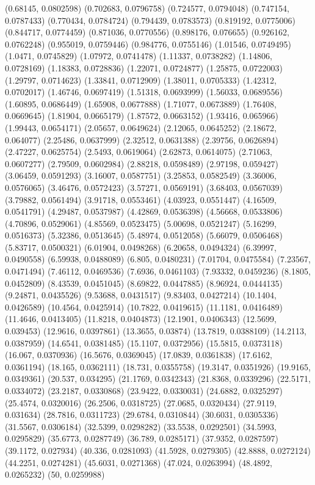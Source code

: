 {(0.68145, 0.0802598)
(0.702683, 0.0796758)
(0.724577, 0.0794048)
(0.747154, 0.0787433)
(0.770434, 0.0784724)
(0.794439, 0.0783573)
(0.819192, 0.0775006)
(0.844717, 0.0774459)
(0.871036, 0.0770556)
(0.898176, 0.076655)
(0.926162, 0.0762248)
(0.955019, 0.0759446)
(0.984776, 0.0755146)
(1.01546, 0.0749495)
(1.0471, 0.0745829)
(1.07972, 0.0741478)
(1.11337, 0.0738282)
(1.14806, 0.0728169)
(1.18383, 0.0728836)
(1.22071, 0.0724877)
(1.25875, 0.0722003)
(1.29797, 0.0714623)
(1.33841, 0.0712909)
(1.38011, 0.0705333)
(1.42312, 0.0702017)
(1.46746, 0.0697419)
(1.51318, 0.0693999)
(1.56033, 0.0689556)
(1.60895, 0.0686449)
(1.65908, 0.0677888)
(1.71077, 0.0673889)
(1.76408, 0.0669645)
(1.81904, 0.0665179)
(1.87572, 0.0663152)
(1.93416, 0.065966)
(1.99443, 0.0654171)
(2.05657, 0.0649624)
(2.12065, 0.0645252)
(2.18672, 0.064077)
(2.25486, 0.0637999)
(2.32512, 0.0631388)
(2.39756, 0.0626894)
(2.47227, 0.0625754)
(2.5493, 0.0619064)
(2.62873, 0.0614075)
(2.71063, 0.0607277)
(2.79509, 0.0602984)
(2.88218, 0.0598489)
(2.97198, 0.059427)
(3.06459, 0.0591293)
(3.16007, 0.0587751)
(3.25853, 0.0582549)
(3.36006, 0.0576065)
(3.46476, 0.0572423)
(3.57271, 0.0569191)
(3.68403, 0.0567039)
(3.79882, 0.0561494)
(3.91718, 0.0553461)
(4.03923, 0.0551447)
(4.16509, 0.0541791)
(4.29487, 0.0537987)
(4.42869, 0.0536398)
(4.56668, 0.0533806)
(4.70896, 0.0529061)
(4.85569, 0.0523475)
(5.00698, 0.0521247)
(5.16299, 0.0516373)
(5.32386, 0.0513645)
(5.48974, 0.0512058)
(5.66079, 0.0506468)
(5.83717, 0.0500321)
(6.01904, 0.0498268)
(6.20658, 0.0494324)
(6.39997, 0.0490558)
(6.59938, 0.0488089)
(6.805, 0.0480231)
(7.01704, 0.0475584)
(7.23567, 0.0471494)
(7.46112, 0.0469536)
(7.6936, 0.0461103)
(7.93332, 0.0459236)
(8.1805, 0.0452809)
(8.43539, 0.0451045)
(8.69822, 0.0447885)
(8.96924, 0.0444135)
(9.24871, 0.0435526)
(9.53688, 0.0431517)
(9.83403, 0.0427214)
(10.1404, 0.0426589)
(10.4564, 0.0425914)
(10.7822, 0.0419615)
(11.1181, 0.0416489)
(11.4646, 0.0413405)
(11.8218, 0.0404873)
(12.1901, 0.0406343)
(12.5699, 0.039453)
(12.9616, 0.0397861)
(13.3655, 0.03874)
(13.7819, 0.0388109)
(14.2113, 0.0387959)
(14.6541, 0.0381485)
(15.1107, 0.0372956)
(15.5815, 0.0373118)
(16.067, 0.0370936)
(16.5676, 0.0369045)
(17.0839, 0.0361838)
(17.6162, 0.0361194)
(18.165, 0.0362111)
(18.731, 0.0355758)
(19.3147, 0.0351926)
(19.9165, 0.0349361)
(20.537, 0.034295)
(21.1769, 0.0342343)
(21.8368, 0.0339296)
(22.5171, 0.0334072)
(23.2187, 0.0330868)
(23.9422, 0.0330031)
(24.6882, 0.0325297)
(25.4574, 0.0320016)
(26.2506, 0.0318725)
(27.0685, 0.0320434)
(27.9119, 0.031634)
(28.7816, 0.0311723)
(29.6784, 0.0310844)
(30.6031, 0.0305336)
(31.5567, 0.0306184)
(32.5399, 0.0298282)
(33.5538, 0.0292501)
(34.5993, 0.0295829)
(35.6773, 0.0287749)
(36.789, 0.0285171)
(37.9352, 0.0287597)
(39.1172, 0.027934)
(40.336, 0.0281093)
(41.5928, 0.0279305)
(42.8888, 0.0272124)
(44.2251, 0.0274281)
(45.6031, 0.0271368)
(47.024, 0.0263994)
(48.4892, 0.0265232)
(50, 0.0259988)
}

